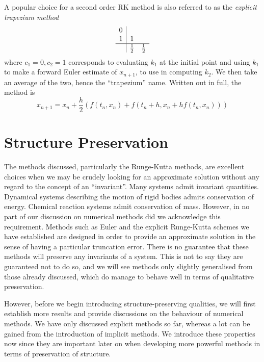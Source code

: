 \documentclass{report}
\theoremstyle{exampstyle} \newtheorem{example}[theorem]{Example}
\theoremstyle{exampstyle} \newtheorem{remark}[theorem]{Remark}
\theoremstyle{exampstyle} \newtheorem{definition}[theorem]{Definition}
\theoremstyle{exampstyle} \newtheorem{lemma}[theorem]{Lemma}
\begin{document}
A popular choice for a second order RK method is also referred to as the \textit{explicit trapezium method}
\begin{equation*}
    \begin{array}{c|cc}
		0 \\
        1  &1 \\
		\hline
		&\frac{1}{2} &\frac{1}{2}
	\end{array}
\end{equation*}
where $c_1 = 0, c_2 = 1$ corresponds to evaluating $k_1$ at the initial point and using $k_1$ to make a forward Euler estimate of $x_{n+1}$, to use in computing $k_2$.
We then take an average of the two, hence the ``trapezium'' name.
Written out in full, the method is
\begin{equation*}
    x_{n+1} = x_n + \frac{h}{2} \left(
        f(t_n, x_n) + f(t_n + h, x_n + h f(t_n, x_n))
    \right)
\end{equation*}

\section{Structure Preservation}

The methods discussed, particularly the Runge-Kutta methods, are excellent choices when we may be crudely looking for an approximate solution without any regard to the concept of an ``invariant''.
Many systems admit invariant quantities.
Dynamical systems describing the motion of rigid bodies admits conservation of energy.
Chemical reaction systems admit conservation of mass.
However, in no part of our discussion on numerical methods did we acknowledge this requirement.
Methods such as Euler and the explicit Runge-Kutta schemes we have established are designed in order to provide an approximate solution in the sense of having a particular truncation error.
There is no guarantee that these methods will preserve any invariants of a system.
This is not to say they are guaranteed not to do so,
and we will see methods only slightly generalised from those already discussed, which do manage to behave well in terms of qualitative preservation.

However, before we begin introducing structure-preserving qualities, we will first establish more results and provide discussions on the behaviour of numerical methods.
We have only discussed explicit methods so far, whereas a lot can be gained from the introduction of implicit methods.
We introduce these properties now since they are important later on when developing more powerful methods in terms of preservation of structure.
\end{document}
